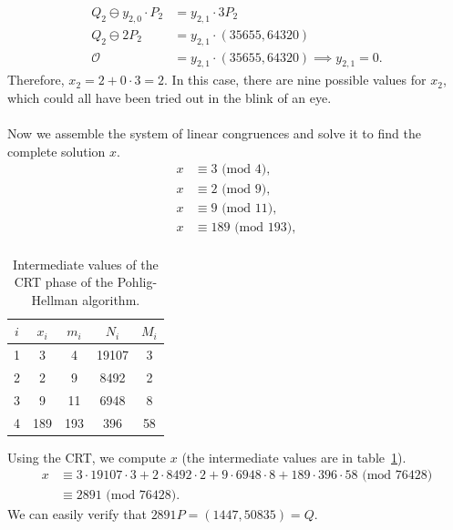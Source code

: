 \documentclass[thesis=M,english]{FITthesis}[2012/10/20]
\theoremstyle{remark}
\theoremstyle{definition}
\begin{document}
\begin{align*}
Q_2 \ominus y_{2,0}\cdot P_2 &= y_{2,1}\cdot 3P_2 \\
Q_2 \ominus 2P_2 &= y_{2,1}\cdot (35655, 64320) \\
\mathcal{O} &= y_{2,1}\cdot (35655, 64320) \implies y_{2,1} = 0.
\end{align*}
Therefore, $x_2 = 2 + 0\cdot 3 = 2$. In this case, there are nine possible values for $x_2$, which could all have been tried out in the blink of an eye. \\\\
\noindent Now we assemble the system of linear congruences and solve it to find the complete solution $x$.
\begin{align*}
x &\equiv 3 \text{ (mod $4$)}, \\
x &\equiv 2 \text{ (mod $9$)}, \\
x &\equiv 9 \text{ (mod $11$)}, \\
x &\equiv 189 \text{ (mod $193$)}, \\
\end{align*}
\begin{table}[!h]
\centering
\begin{tabular}{ |c||c|c|c|c| } 
\hline
 $i$ & $x_i$ & $m_i$ & $N_i$ & $M_i$ \\
\hline
\hline
1 & 3 & 4 & 19107 &  3 \\ \hline
2 & 2 & 9 & 8492 & 2\\ \hline \hline
3 & 9 & 11 & 6948 & 8 \\ \hline
4 & 189 &193 & 396 & 58 \\ \hline
\end{tabular}
\caption[CRT phase of the Pohlig-Hellman algorithm]{Intermediate values of the CRT phase of the Pohlig-Hellman algorithm.}
\label{tblPH3}
\end{table}
\noindent Using the CRT, we compute $x$ (the intermediate values are in table~\ref{tblPH3}).
\begin{align*}
x &\equiv 3\cdot 19107 \cdot 3 + 2\cdot 8492 \cdot 2 +  9\cdot 6948 \cdot 8 +  189\cdot 396 \cdot 58 \text{ (mod  76428)}\\
 &\equiv 2891\text{ (mod  76428)}.
\end{align*}
We can easily verify that $2891P = (1447, 50835) = Q.$
\end{document}

